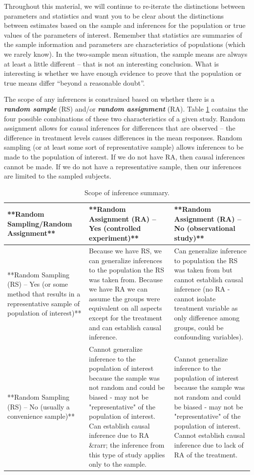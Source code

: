 \documentclass[]{book}
\begin{document}
Throughout this material, we will continue to re-iterate the
distinctions between parameters and statistics and want you to be clear
about the distinctions between estimates based on the sample and
inferences for the population or true values of the parameters of
interest. Remember that statistics are summaries of the sample
information and parameters are characteristics of populations (which we
rarely know). In the two-sample mean situation, the sample means are
always at least a little different -- that is not an interesting
conclusion. What is interesting is whether we have enough evidence to
prove that the population or true means differ ``beyond a reasonable
doubt''.

The scope of any inferences is constrained based on whether there is a\\
\textbf{\emph{random sample}} (RS) and/or \textbf{\emph{random
assignment}} (RA). Table \ref{tab:Table2-1} contains the four possible
combinations of these two characteristics of a given study. Random
assignment allows for causal inferences for differences that are
observed -- the difference in treatment levels causes differences in the
mean responses. Random sampling (or at least some sort of representative
sample) allows inferences to be made to the population of interest. If
we do not have RA, then causal inferences cannot be made. If we do not
have a representative sample, then our inferences are limited to the
sampled subjects.



\begin{table}

\caption{\label{tab:Table2-1}Scope of inference summary.}
\centering
\begin{tabular}[t]{l|l|l}
\hline
**Random Sampling/Random Assignment** & **Random Assignment (RA) -- Yes (controlled experiment)** & **Random Assignment (RA) -- No (observational study)**\\
\hline
**Random Sampling (RS) -- Yes (or some method that results in a representative sample of population of interest)** & Because we have RS, we can generalize inferences to the population the RS was taken from. Because we have RA we can assume the groups were equivalent on all aspects except for the treatment and can establish causal inference. & Can generalize inference to population the RS was taken from but cannot establish causal inference (no RA - cannot isolate treatment variable as only difference among groups, could be confounding variables).\\
\hline
**Random Sampling (RS) -- No (usually a convenience sample)** & Cannot generalize inference to the population of interest because the sample was not random and could be biased - may not be "representative" of the population of interest. Can establish causal inference due to RA   \&rarr; the inference from this type of study applies only to the sample. & Cannot generalize inference to the population of interest because the sample was not random and could be biased - may not be "representative" of the population of interest. Cannot establish causal inference due to lack of RA of the treatment.\\
\hline
\end{tabular}
\end{table}
\end{document}
